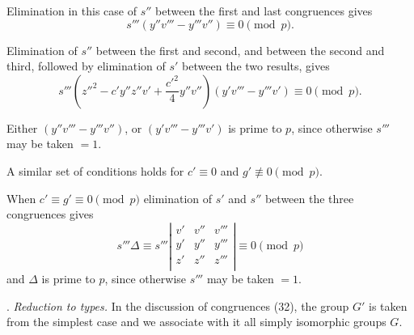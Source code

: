 \documentclass[oneside]{article}
\begin{document}
Elimination in this case of $s''$ between the first and last congruences
gives
\begin{equation*}
s'''(y''v''' - y'''v'') \equiv 0 \pmod{p}.
\end{equation*}

Elimination of $s''$ between the first and second, and between the second
and third, followed by elimination of $s'$ between the two results, gives
\begin{equation*}
s'''\left(z''^2 - c'y''z''v' + \frac{c'^2}{4}y''v''\right)
(y'v''' - y'''v') \equiv 0 \pmod{p}.
\end{equation*}

Either $(y''v''' - y'''v'')$, or $(y'v''' - y'''v')$ is prime to $p$,
since otherwise $s'''$ may be taken $= 1$.

A similar set of conditions holds for $c' \equiv 0$ and $g' \not\equiv 0
\pmod{p}$.

When $c' \equiv g' \equiv 0 \pmod{p}$ elimination of $s'$ and $s''$ between
the three congruences gives
\begin{equation*}
s'''\Delta \equiv s''' \left|\begin{matrix}
                              v' & v'' & v''' \\
                              y' & y'' & y''' \\
                              z' & z'' & z''' \\ \end{matrix}\right|
\equiv 0 \pmod{p}
\end{equation*}
\noindent and $\Delta$ is prime to $p$, since otherwise $s'''$
may be taken $= 1$.

. \textit{Reduction to types.} In the discussion of congruences (32), the
group $G'$ is taken from the simplest case and we associate with it all
simply isomorphic groups $G$.
\end{document}
